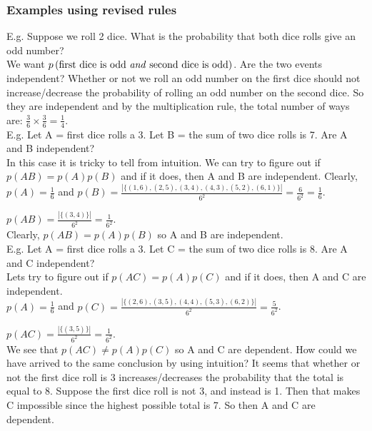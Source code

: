 \documentclass[12pt, letterpaper]{article}
\begin{document}
\subsubsection{Examples using revised rules}
E.g. Suppose we roll 2 dice. What is the probability that both dice rolls give an odd number?\\

We want \(p\left(\text{first dice is odd \emph{and} second dice is odd}\right)\). Are the two events independent? Whether or not we roll an odd number on the first dice should not increase/decrease the probability of rolling an odd number on the second dice. So they are independent and by the multiplication rule, the total number of ways are: \(\frac{3}{6} \times \frac{3}{6} = \frac{1}{4}\).\\

E.g. Let A = first dice rolls a 3. Let B = the sum of two dice rolls is 7. Are A and B independent?\\

In this case it is tricky to tell from intuition. We can try to figure out if \(p\left(AB\right) = p\left(A\right)p\left(B\right)\) and if it does, then A and B are independent. Clearly, \(p\left(A\right) = \frac{1}{6}\) and \(p\left(B\right) = \frac{|\{(1, 6), (2, 5), (3, 4), (4, 3), (5, 2), (6, 1)\}|}{6^2} = \frac{6}{6^2} = \frac{1}{6}\).

\(p\left(AB\right) = \frac{|\{(3, 4)\}|}{6^2} = \frac{1}{6^2}\).\\

Clearly, \(p\left(AB\right) = p\left(A\right)p\left(B\right)\) so A and B are independent.\\

E.g. Let A = first dice rolls a 3. Let C = the sum of two dice rolls is 8. Are A and C independent?\\

Lets try to figure out if \(p\left(AC\right) = p\left(A\right)p\left(C\right)\) and if it does, then A and C are independent.\\

\(p\left(A\right) = \frac{1}{6}\) and \(p\left(C\right) = \frac{|\{(2, 6), (3, 5), (4, 4), (5, 3), (6, 2)\}|}{6^2} = \frac{5}{6^2}\).

\(p\left(AC\right) = \frac{|\{(3, 5)\}|}{6^2} = \frac{1}{6^2}\).\\

We see that \(p\left(AC\right) \neq p\left(A\right)p\left(C\right)\) so A and C are dependent. How could we have arrived to the same conclusion by using intuition? It seems that whether or not the first dice roll is 3 increases/decreases the probability that the total is equal to 8. Suppose the first dice roll is not 3, and instead is 1. Then that makes C impossible since the highest possible total is 7. So then A and C are dependent.
\end{document}
